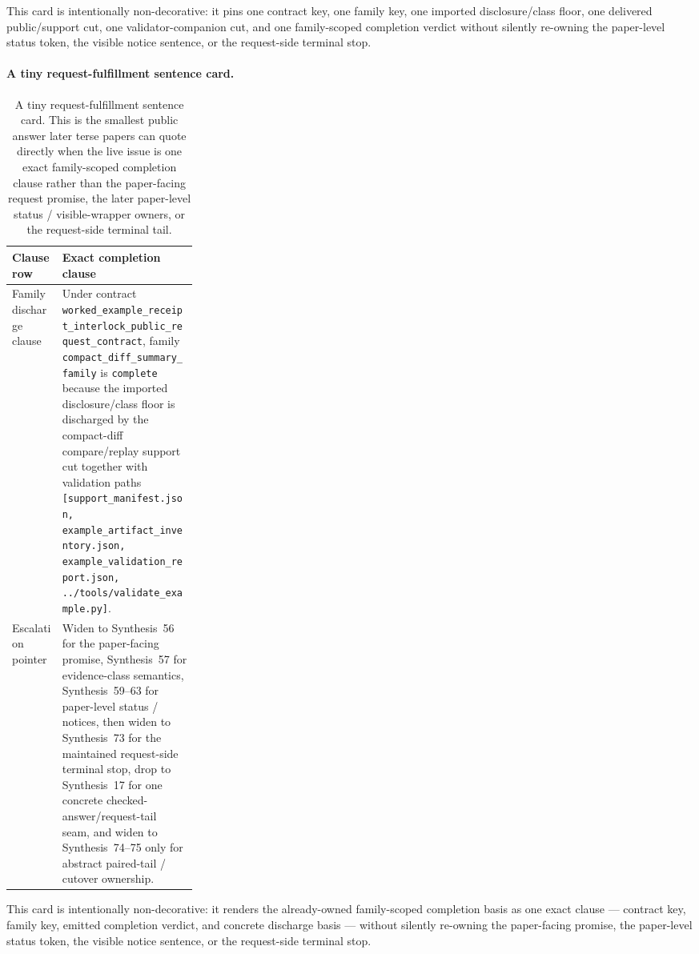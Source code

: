 \documentclass[11pt]{article}
\begin{document}
This card is intentionally non-decorative: it pins one contract key, one family key, one imported disclosure/class floor, one delivered public/support cut, one validator-companion cut, and one family-scoped completion verdict without silently re-owning the paper-level status token, the visible notice sentence, or the request-side terminal stop.\cite{series:workedexample}

\paragraph{A tiny request-fulfillment sentence card.}
\begin{table}[t]
\centering
\small
\begin{tabularx}{0.97\linewidth}{@{}p{0.27\linewidth}X@{}}
\toprule
\textbf{Clause row} & \textbf{Exact completion clause}\\
\midrule
Family discharge clause & Under contract \nolinkurl{worked\_example\_receipt\_interlock\_public\_request\_contract}, family \nolinkurl{compact\_diff\_summary\_family} is \texttt{complete} because the imported disclosure/class floor is discharged by the compact-diff compare/replay support cut together with validation paths \nolinkurl{[support\_manifest.json, example\_artifact\_inventory.json, example\_validation\_report.json, ../tools/validate\_example.py]}. \\
Escalation pointer & Widen to Synthesis~56 for the paper-facing promise, Synthesis~57 for evidence-class semantics, Synthesis~59--63 for paper-level status / notices, then widen to Synthesis~73 for the maintained request-side terminal stop, drop to Synthesis~17 for one concrete checked-answer/request-tail seam, and widen to Synthesis~74--75 only for abstract paired-tail / cutover ownership. \\
\bottomrule
\end{tabularx}
\caption{A tiny request-fulfillment sentence card. This is the smallest public answer later terse papers can quote directly when the live issue is one exact family-scoped completion clause rather than the paper-facing request promise, the later paper-level status / visible-wrapper owners, or the request-side terminal tail.}
\label{tab:request-fulfillment-sentence-card}
\end{table}

This card is intentionally non-decorative: it renders the already-owned family-scoped completion basis as one exact clause --- contract key, family key, emitted completion verdict, and concrete discharge basis --- without silently re-owning the paper-facing promise, the paper-level status token, the visible notice sentence, or the request-side terminal stop.\cite{series:workedexample}
\end{document}
